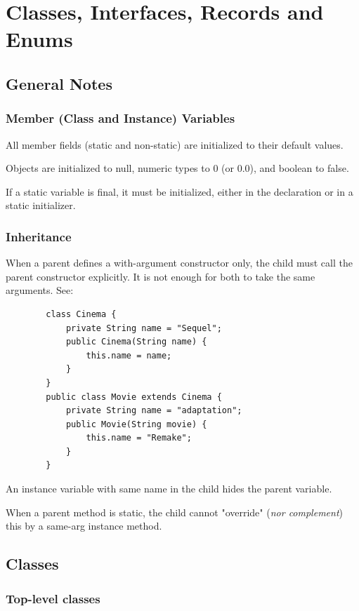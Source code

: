 \documentclass{scrartcl}
\begin{document}
\section{Classes, Interfaces, Records and Enums}
\subsection{General Notes}

\subsubsection{Member (Class and Instance) Variables}

All member fields (static and non-static) are initialized to their default values.

Objects are initialized to null, numeric types to 0 (or 0.0), and boolean to false.

If a static variable is final, it must be initialized, either in the declaration or in a static initializer.

\subsubsection{Inheritance}

    When a parent defines a with-argument constructor only, the child must call the parent constructor explicitly. It is not enough for both to take the same arguments. See:

    \begin{lstlisting}
        class Cinema {
            private String name = "Sequel";
            public Cinema(String name) {
                this.name = name;
            }
        }
        public class Movie extends Cinema {
            private String name = "adaptation";
            public Movie(String movie) {
                this.name = "Remake";
            }
        }
    \end{lstlisting}

    An instance variable with same name in the child hides the parent variable.

    When a parent method is static, the child cannot "override" (\textit{nor complement}) this by a same-arg instance method.

\subsection{Classes}

\subsubsection{Top-level classes}
\end{document}
